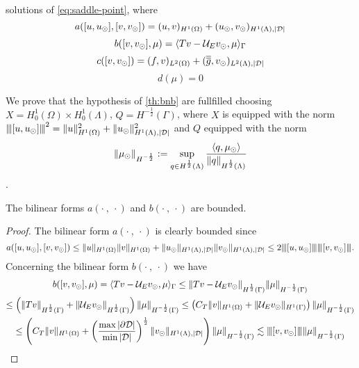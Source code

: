 solutions of \eqref{eq:saddle-point}, where
\begin{equation*}
a([u, u_{\odot}], [v, v_{\odot}])= (u,v)_{H^1(\Omega)} + (u_{\odot},v_{\odot})_{H^1(\Lambda),|\mathcal{D}|}
\end{equation*} 
\begin{equation*}
b([v, v_{\odot}], \mu)= \langle T v - \mathcal{U}_E v_{\odot} , \mu \rangle_\Gamma
\end{equation*} 
\begin{equation*}
c([v,v_{\odot}])= (f,v)_{L^2(\Omega)} + (\overline{\overline{g}},v_{\odot})_{L^2(\Lambda),|\mathcal{D}|}
\end{equation*}
\begin{equation*}
d(\mu)=0
\end{equation*}

We prove that the hypothesis of \ref{th:bnb} are fullfilled choosing 
$X=H^1_0(\Omega) \times H^1_0(\Lambda)$, $Q=H^{-\frac 12}(\Gamma)$, where $X$  is equipped with the norm ${\left\vert\kern-0.25ex\left\vert\kern-0.25ex\left\vert [u,u_{\odot} ] \right\vert\kern-0.25ex\right\vert\kern-0.25ex\right\vert}^2=\|u\|^2_{H^1(\Omega)} + \|u_{\odot}\|^2_{H^1(\Lambda),|\mathcal{D}|}$ and $Q$ equipped with the norm
\begin{equation*}
\|\mu_{\odot} \|_{H^{-\frac 12}} := \sup_{q\in H^{\frac 12}(\Lambda)}\frac{\langle q, \mu_{\odot}\rangle}{\|q\|_{H^{\frac 12}(\Lambda)}}
\end{equation*}. 
\begin{lemma}\label{lemma:prob1_boundedness} 
The bilinear forms $a(\cdot \ , \ \cdot)$ and $b(\cdot \ , \ \cdot)$ are bounded.
\end{lemma}
\begin{proof}
The bilinear form $a(\cdot \ , \ \cdot)$ is clearly bounded since
\begin{equation*}
a([u, u_{\odot}], [v, v_{\odot}])\leq \|u\|_{H^1(\Omega)}\|v\|_{H^1(\Omega)} + \|u_{\odot}\|_{H^1(\Lambda), |\mathcal{D}|}\|v_{\odot}\|_{H^1(\Lambda), |\mathcal{D}|} \leq 2 {\left\vert\kern-0.25ex\left\vert\kern-0.25ex\left\vert [u, u_{\odot}] \right\vert\kern-0.25ex\right\vert\kern-0.25ex\right\vert}{\left\vert\kern-0.25ex\left\vert\kern-0.25ex\left\vert [v, v_{\odot}] \right\vert\kern-0.25ex\right\vert\kern-0.25ex\right\vert}.
\end{equation*}
Concerning the bilinear form $b(\cdot \ , \ \cdot)$ we have
\begin{multline*}
b([v, v_{\odot}], \mu)= \langle T v - \mathcal{U}_E v_{\odot} , \mu \rangle_\Gamma 
\leq \|T v - \mathcal{U}_E v_{\odot}\|_{H^{\frac 12}(\Gamma)}\|\mu\|_{H^{-\frac 12}(\Gamma)}\\
\leq \left(\|T v\|_{H^{\frac 12}(\Gamma)} + \|\mathcal{U}_E v_{\odot}\|_{H^{\frac 12}(\Gamma)}\right)\|\mu\|_{H^{-\frac 12}(\Gamma)}
\leq \left(C_T \|v\|_{H^1(\Omega)} + \|\mathcal{U}_E v_{\odot}\|_{H^1(\Gamma)}\right)\|\mu\|_{H^{-\frac 12}(\Gamma)}\\
\leq \left(C_T \|v\|_{H^1(\Omega)} + \left(\frac{\max |\partial\mathcal{D}|}{\min |\mathcal{D}|}\right)^{\frac 12} \|v_{\odot}\|_{H^1(\Lambda),|\mathcal{D}|}\right)\|\mu\|_{H^{-\frac 12}(\Gamma)}
\lesssim {\left\vert\kern-0.25ex\left\vert\kern-0.25ex\left\vert [v,v_{\odot}] \right\vert\kern-0.25ex\right\vert\kern-0.25ex\right\vert}\|\mu\|_{H^{-\frac 12}(\Gamma)}
\end{multline*}
\end{proof}

